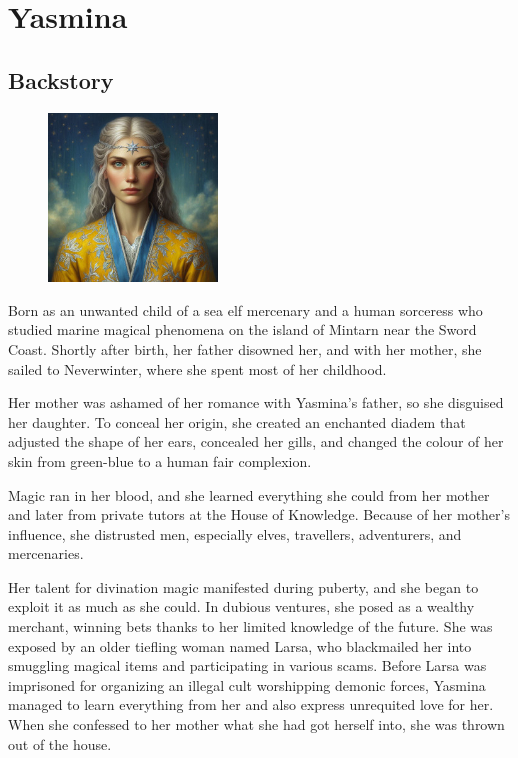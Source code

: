 \documentclass[10pt,onecolumn,twoside,openany,bg=full,layout=true]{dndbook}
\begin{document}
\vfill
\pagebreak


\section{Yasmina}\label{sec:yasmina}
\subsection{Backstory}\label{subsec:yasmina-backstory}
\begin{figure}
  \begin{center}
    \includegraphics[width=0.4\textwidth]{img/yasmina}
    \vspace{1cm}
  \end{center}
\end{figure}
Born as an unwanted child of a sea elf mercenary and a human sorceress who studied marine magical phenomena on the
island of Mintarn near the Sword Coast.
Shortly after birth, her father disowned her, and with her mother, she sailed
to Neverwinter, where she spent most of her childhood.

Her mother was ashamed of her romance with Yasmina's father, so she disguised her daughter.
To conceal her origin, she created an enchanted diadem that adjusted the shape of her ears, concealed her gills,
and changed the colour of her skin from green-blue to a human fair complexion.

Magic ran in her blood, and she learned everything she could from her mother and later from private tutors at the
House of Knowledge.
Because of her mother's influence, she distrusted men, especially elves, travellers, adventurers, and mercenaries.

Her talent for divination magic manifested during puberty, and she began to exploit it as much as she could.
In dubious ventures, she posed as a wealthy merchant, winning bets thanks to her limited knowledge of the future.
She was exposed by an older tiefling woman named Larsa, who blackmailed her into smuggling magical items and
participating in various scams.
Before Larsa was imprisoned for organizing an illegal cult worshipping demonic forces, Yasmina managed to learn
everything from her and also express unrequited love for her.
When she confessed to her mother what she had got herself into, she was thrown out of the house.
\end{document}
